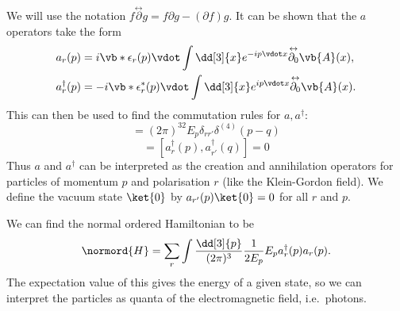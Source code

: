 \documentclass{jknotes} %
\begin{document}
We will use the notation \(f\overset{\leftrightarrow}{\partial}g = f\partial g - (\partial f) g\). It can be shown that the \(a\) operators take the form
\begin{align}
    a_r(p) &= i\vb*{\epsilon}_r(p)\vdot\int\dd[3]{x}e^{-ip\vdot x}\overset{\leftrightarrow}{\partial_0}\vb{A}(x),\\
    a^\dagger_r(p) &= -i\vb*{\epsilon}^*_r(p)\vdot\int\dd[3]{x}e^{ip\vdot x}\overset{\leftrightarrow}{\partial_0}\vb{A}(x).
\end{align}
This can then be used to find the commutation rules for \(a,a^\dagger\):
\begin{equation}
    [a_r(p),a^\dagger_{r'}(q)] = (2\pi)^32E_p\delta_{rr'}\delta^{(4)}(p-q)
\end{equation}
\begin{equation}
    [a_r(p),a_{r'}(q)] = [a_r^\dagger(p),a_{r'}^\dagger(q)] = 0
\end{equation}
Thus \(a\) and \(a^\dagger\) can be interpreted as the creation and annihilation operators for particles of momentum \(p\) and polarisation \(r\) (like the Klein-Gordon field). We define the vacuum state \(\ket{0}\) by \(a_{r'}(p)\ket{0} = 0\) for all \(r\) and \(p\).

We can find the normal ordered Hamiltonian to be
\begin{equation}
    \normord{H} = \sum_r\int\frac{\dd[3]{p}}{(2\pi)^3}\frac{1}{2E_p}E_p a^\dagger_r(p)a_r(p).
\end{equation}
The expectation value of this gives the energy of a given state, so we can interpret the particles as quanta of the electromagnetic field, i.e.\ photons.
\end{document}
